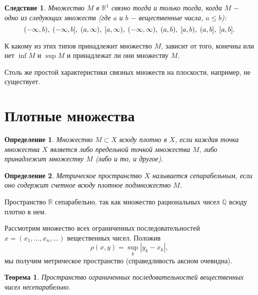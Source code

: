 \documentclass{article}
\newtheorem{theorem}{Теорема}[section]
\newtheorem{definition}{Определение}[section]
\newtheorem*{consequence}{Следствие}
\begin{document}
\begin{consequence}
Множество \(M\) в \(\mathbb{R}^1\) связно тогда и только тогда, когда \(M\) \(-\) одно из следующих множеств (где \(a\) и \(b\) \(-\) вещественные числа, \(a \leq b\)):
\[
(-\infty, b), \hspace{1mm} (-\infty, b], \hspace{1mm} (a, \infty), \hspace{1mm} [a, \infty), \hspace{1mm} (-\infty, \infty), \hspace{1mm} (a, b), \hspace{1mm} [a, b), \hspace{1mm} (a, b], \hspace{1mm} [a, b].
\]
\end{consequence}

К какому из этих типов принадлежит множество \(M\), зависит от того, конечны или нет \(\inf M\) и \(\sup M\) и принадлежат ли они множеству \(M\).

Столь же простой характеристики связных множеств на плоскости, например, не существует.

\section{Плотные множества}

\begin{definition}
Множество \(M \subset X\) всюду плотно в \(X\), если каждая точка множества \(X\) является либо предельной точкой множества \(M\), либо принадлежит множеству \(M\) (либо и то, и другое).
\end{definition}

\begin{definition}
Метрическое пространство \(X\) называется сепарабельным, если оно содержит счетное всюду плотное подмножество \(M\).
\end{definition}

Пространство \(\mathbb{R}\) сепарабельно, так как множество рациональных чисел \(\mathbb{Q}\) всюду плотно в нем. \newline

Рассмотрим множество всех ограниченных последовательностей \(x = (x_1, ..., x_n, ...)\) вещественных чисел. Положив
\[
\rho(x, y) = \sup\limits_{k} |y_k - x_k|,
\]
мы получим метрическое пространство (справедливость аксиом очевидна).

\begin{theorem}
Пространство ограниченных последовательностей вещественных чисел несепарабельно.
\end{theorem}
\end{document}
